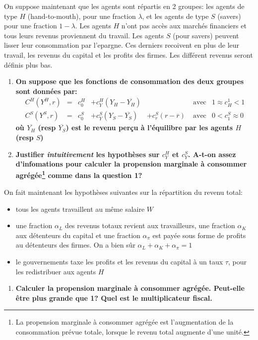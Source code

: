 \documentclass[
]{article}
\providecommand{\tightlist}{%
  \setlength{\itemsep}{0pt}\setlength{\parskip}{0pt}}
\begin{document}
On suppose maintenant que les agents sont répartis en 2 groupes: les
agents de type \(H\) (hand-to-mouth), pour une fraction \(\lambda\), et
les agents de type \(S\) (savers) pour une fraction \(1-\lambda\). Les
agents \(H\) n'ont pas accès aux marchés financiers et tous leurs
revenus proviennent du travail. Les agents \(S\) (pour savers) peuvent
lisser leur consommation par l'epargne. Ces derniers recoivent en plus
de leur travail, les revenus du capital et les profits des firmes. Les
différent revenus seront définis plus bas.

\begin{enumerate}
\def\labelenumi{\arabic{enumi}.}
\setcounter{enumi}{4}
\item
  \textbf{On suppose que les fonctions de consommation des deux groupes
  sont données par:} \begin{align}
  C^H(Y^H,r) & = & c^H_0 & + c^H_Y (Y_H - \overline{Y_H}) &  & \;\text{avec} & 1\approx c^1_H<1\\
  C^S(Y^S,r) & = & c^S_0 & + c^S_Y (Y_S - \overline{Y_S}) & + c^S_r (r-\overline{r}) & \;\text{avec} & 0<c_1^S\approx 0 
  \end{align} \textbf{où \(\overline{Y_H}\) (resp \(\overline{Y_S}\))
  est le revenu perçu à l'équilibre par les agents \(H\) (resp \(S\))}
\item
  \textbf{Justifier \emph{intuitivement} les hypothèses sur \(c^H_Y\) et
  \(c^S_Y\). A-t-on assez d'infomations pour calculer la propension
  marginale à consommer agrégée\footnote{La propension marginale à
    consommer agrégée est l'augmentation de la consommation prévue
    totale, lorsque le revenu total augmente d'une unité.} comme dans la
  question 1?}
\end{enumerate}

On fait maintenant les hypothèses suivantes sur la répartition du revenu
total:

\begin{itemize}
\tightlist
\item
  tous les agents travaillent au même salaire \(W\)
\item
  une fraction \(\alpha_L\) des revenus totaux revient aux travailleurs,
  une fraction \(\alpha_K\) aux détenteurs du capital et une fraction
  \(\alpha_\pi\) est payée sous forme de profits au détenteurs des
  firmes. On a bien sûr \(\alpha_L + \alpha_K + \alpha_\pi=1\)
\item
  le gouvernements taxe les profits et les revenus du capital à un taux
  \(\tau\), pour les redistribuer aux agents \(H\)
\end{itemize}

\begin{enumerate}
\def\labelenumi{\arabic{enumi}.}
\setcounter{enumi}{6}
\tightlist
\item
  \textbf{Calculer la propension marginale à consommer agrégée.
  Peut-elle être plus grande que 1? Quel est le multiplicateur fiscal.}
\end{enumerate}
\end{document}
